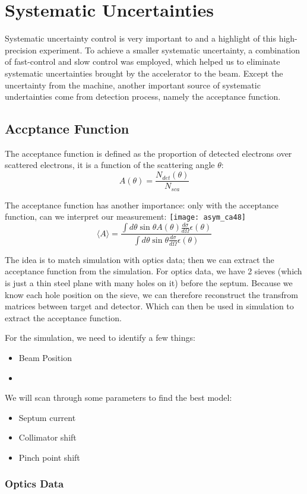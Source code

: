 \section{Systematic Uncertainties}
Systematic uncertainty control is very important to and a highlight of this 
high-precision experiment. To achieve a smaller systematic uncertainty, a
combination of fast-control and slow control was employed, which helped us
to eliminate systematic uncertainties brought by the accelerator to the
beam. Except the uncertainty from the machine, another important source
of systematic undertainties come from detection process, namely the 
acceptance function.

\subsection{Accptance Function}
The acceptance function is defined as the proportion of detected electrons
over scattered electrons, it is a function of the scattering angle $\theta$:
$$ A(\theta) = \frac{N_{det}(\theta)}{N_{sca}} $$

The acceptance function has another importance: only with the acceptance
function, can we interpret our measurement:
\texttt{[image: asym\_ca48]}
\begin{equation*}
    \langle A \rangle = \frac{\int d\theta \sin\theta A(\theta) \frac{d\sigma}{d\Omega} \epsilon(\theta)}{\int d\theta \sin\theta \frac{d\sigma}{d\Omega} \epsilon(\theta)}
\end{equation*}

The idea is to match simulation with optics data; then we can extract the 
acceptance function from the simulation. For optics data, we have 2 sieves
(which is just a thin steel plane with many holes on it) before the septum.
Because we know each hole position on the sieve, we can therefore reconstruct
the transfrom matrices between target and detector. Which can then be used in
simulation to extract the acceptance function.

For the simulation, we need to identify a few things:
\begin{itemize}
    \item Beam Position
    \item 
\end{itemize}

We will scan through some parameters to find the best model:
\begin{itemize}
    \item Septum current
    \item Collimator shift
    \item Pinch point shift
\end{itemize}

\subsubsection{Optics Data}
